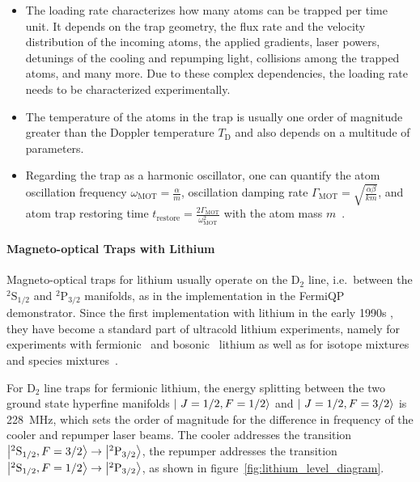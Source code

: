\begin{itemize}
    \item The loading rate characterizes how many atoms can be trapped per time unit. It depends on the trap geometry, the flux rate and the velocity distribution of the incoming atoms, the applied gradients, laser powers, detunings of the cooling and repumping light, collisions among the trapped atoms, and many more. Due to these complex dependencies, the loading rate needs to be characterized experimentally.
    \item The temperature of the atoms in the trap is usually one order of magnitude greater than the Doppler temperature $T_\text{D}$ and also depends on a multitude of parameters.
    \item Regarding the trap as a harmonic oscillator, one can quantify the atom oscillation frequency $\omega_\text{MOT} = \frac{\alpha}{m}$, oscillation damping rate $\Gamma_\text{MOT} = \sqrt{\frac{\alpha \beta}{km}}$, and atom trap restoring time $t_\text{restore} = \frac{2\Gamma_\text{MOT}}{\omega_\text{MOT}^2}$ with the atom mass $m$~\cite{metcalf_laser_1999}.
\end{itemize}

\paragraph{Magneto-optical Traps with Lithium}\label{ch:3d_mots_with_li}
Magneto-optical traps for lithium usually operate on the D$_2$ line, i.e.~between the $^2\text{S}_{1/2}$ and $^2\text{P}_{3/2}$ manifolds, as in the implementation in the FermiQP demonstrator. Since the first implementation with lithium in the early 1990s \cite{kawanaka_decay_1993}, they have become a standard part of ultracold lithium experiments, namely for experiments with fermionic~\cite{duarte_all-optical_2011,omran_microscopic_2015} and bosonic~\cite{kawanaka_decay_1993,schunemann_magneto-optic_1998} lithium as well as for isotope mixtures \cite{mewes_simultaneous_1999, schreck_sympathetic_2001, hilker_laser_2012, kerkmann_novel_2019} and species mixtures~\cite{ladouceur_compact_2009,tiecke_high-flux_2009,chen_lithium-cesium_2021}.

For D$_2$ line traps for fermionic lithium, the energy splitting between the two ground state hyperfine manifolds $\Ket{~J=1/2, F=1/2}$ and $\Ket{~J=1/2, F=3/2}$ is \SI{228}{\mega\hertz}, which sets the order of magnitude for the difference in frequency of the cooler and repumper laser beams. The cooler addresses the transition $\Ket{^2\text{S}_{1/2}, F = 3/2} \rightarrow \Ket{^2\text{P}_{3/2}}$, the repumper addresses the transition $\Ket{^2\text{S}_{1/2}, F = 1/2} \rightarrow \Ket{^2\text{P}_{3/2}}$, as shown in figure~\ref{fig:lithium_level_diagram}.

